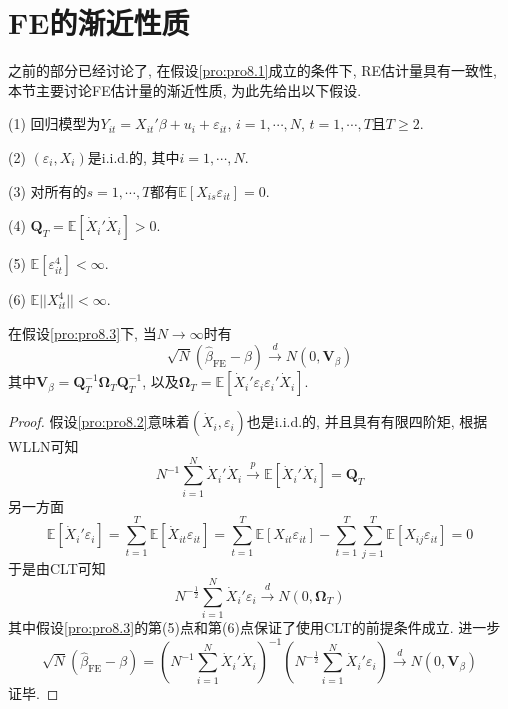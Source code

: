 \documentclass[cn, 12pt, math=mtpro2, bibstyle=apa, blue, twocol]{elegantbook}
\newcommand{\E}{\mathbb{E}}
\newcommand{\Q}{\mathbold{Q}}
\newcommand{\hb}{\hat{\beta}}
\newcommand{\V}{\mathbold{V}}
\newcommand{\BO}{\mathbold{\Omega}}
\begin{document}
\section{FE的渐近性质}
之前的部分已经讨论了, 在假设\ref{pro:pro8.1}成立的条件下, RE估计量具有一致性, 本节主要讨论FE估计量的渐近性质, 为此先给出以下假设.
\begin{proposition}\label{pro:pro8.3}
(1) 回归模型为$Y_{it}=X_{it}'\beta+u_i+\varepsilon_{it}$, $i=1,\cdots,N$, $t=1,\cdots,T$且$T\geq2$.

(2) $(\varepsilon_i, X_i)$是i.i.d.的, 其中$i=1,\cdots,N$.

(3) 对所有的$s=1,\cdots,T$都有$\E[X_{is}\varepsilon_{it}]=0$.

(4) $\Q_T=\E[\dot{X}_i'\dot{X}_i]>0$.

(5) $\E[\varepsilon_{it}^4]<\infty$.

(6) $\E||X_{it}^4||<\infty$.
\end{proposition}
\begin{theorem}\label{thm:thm8.1}
  在假设\ref{pro:pro8.3}下, 当$N\to\infty$时有
  $$\sqrt{N}(\hb_{\text{FE}}-\beta)\xrightarrow{d}N(0,\V_\beta)$$
  其中$\V_\beta=\Q_T^{-1}\BO_T\Q^{-1}_T$, 以及$\BO_T=\E[\dot{X}_i'\varepsilon_i\varepsilon_i'\dot{X}_i]$.
\end{theorem}
\begin{proof}
  假设\ref{pro:pro8.2}意味着$(\dot{X}_i,\varepsilon_i)$也是i.i.d.的, 并且具有有限四阶矩, 根据WLLN可知
  $$N^{-1}\sum_{i=1}^{N}\dot{X}_i'\dot{X}_i\xrightarrow{p}\E[\dot{X}_i'\dot{X}_i]=\Q_T$$
  另一方面
  $$\E[\dot{X}_i'\varepsilon_i]=\sum_{t=1}^{T}\E[\dot{X}_{it}\varepsilon_{it}]=\sum_{t=1}^{T}\E[X_{it}\varepsilon_{it}]-\sum_{t=1}^{T}\sum_{j=1}^{T}\E[X_{ij}\varepsilon_{it}]=0$$
  于是由CLT可知
  $$N^{-\frac{1}{2}}\sum_{i=1}^{N}\dot{X}_i'\varepsilon_i\xrightarrow{d} N(0,\BO_T)$$
  其中假设\ref{pro:pro8.3}的第(5)点和第(6)点保证了使用CLT的前提条件成立. 进一步
  $$\sqrt{N}(\hb_{\text{FE}}-\beta)=\left(N^{-1}\sum_{i=1}^{N}\dot{X}_i'\dot{X}_i\right)^{-1}\left(N^{-\frac{1}{2}}\sum_{i=1}^{N}\dot{X}_i'\varepsilon_i\right)\xrightarrow{d} N(0,\V_\beta)$$
  证毕.
\end{proof}
\end{document}
